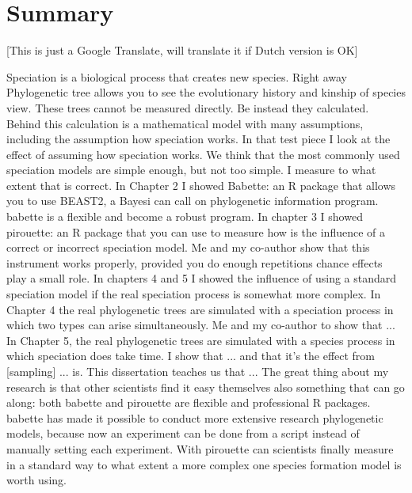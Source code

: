 \chapter*{Summary}

[This is just a Google Translate, will translate it if Dutch version is OK]

Speciation is a biological process that creates new species. Right away
Phylogenetic tree allows you to see the evolutionary history and kinship of species
view. These trees cannot be measured directly. Be instead
they calculated. Behind this calculation is a mathematical model with many assumptions,
including the assumption how speciation works.
In that test piece I look at the effect of assuming how speciation works.
We think that the most commonly used speciation models are simple enough,
but not too simple. I measure to what extent that is correct.
In Chapter 2 I showed Babette: an R package that allows you to use BEAST2, a Bayesi
can call on phylogenetic information program. babette is a flexible and
become a robust program.
In chapter 3 I showed pirouette: an R package that you can use to measure how
is the influence of a correct or incorrect speciation model. Me and my co-author
show that this instrument works properly, provided you do enough repetitions
chance effects play a small role.
In chapters 4 and 5 I showed the influence of using a standard
speciation model if the real speciation process is somewhat more complex. In
Chapter 4 the real phylogenetic trees are simulated with a speciation
process in which two types can arise simultaneously. Me and my co-author
to show that ...
In Chapter 5, the real phylogenetic trees are simulated with a species
process in which speciation does take time. I show that ... and that it's the effect
from [sampling] ... is.
This dissertation teaches us that ...
The great thing about my research is that other scientists find it easy themselves
also something that can go along: both babette and pirouette are flexible and professional R
packages. babette has made it possible to conduct more extensive research
phylogenetic models, because now an experiment can be done from a script
instead of manually setting each experiment. With pirouette can
scientists finally measure in a standard way to what extent a more complex one
species formation model is worth using.
